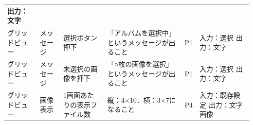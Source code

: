 \begin{table}[htbp]
\begin{tabular}{|p{8em}|p{7em}|p{9em}|p{9em}|p{3em}|p{12em}|}
出力：文字 \bigstrut\\
    \hline
    グリッドビュー & メッセージ & 選択ボタン押下 & 「アルバムを選択中」というメッセージが出ること & P1    & 入力：選択
出力：文字 \bigstrut\\
    \hline
    グリッドビュー & メッセージ & 未選択の画像を押下 & 「○枚の画像を選択」というメッセージが出ること & P1    & 入力：選択
出力：文字 \bigstrut\\
    \hline
    グリッドビュー & 画像表示  & 1画面あたりの表示ファイル数 & 縦：4×10．横：3×7になること & P4    & 入力：既存設定
出力：文字　画像 \bigstrut\\
    \hline
    \end{tabular}%
  \label{tab:D-4-ER-2}%
\end{table}%

